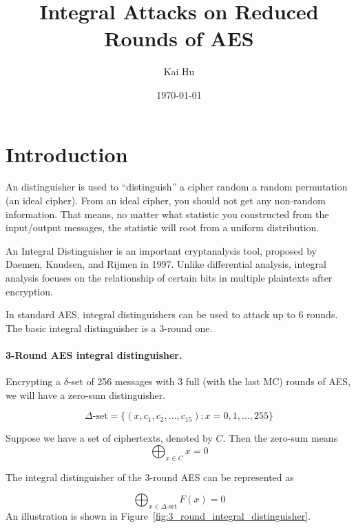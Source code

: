 \documentclass[12pt,journal=tosc, notanonymous]{iacrtrans}
\title{Integral Attacks on Reduced Rounds of AES}
\author{Kai Hu}
\date{\today}
\begin{document}
\maketitle


\section{Introduction}

An distinguisher is used to ``distinguish'' a cipher random a random permutation (an ideal cipher). 
From an ideal cipher, you should not get any non-random information. 
That means, no matter what statistic you constructed from the input/output messages, the statistic will root from a uniform distribution.

An Integral Distinguisher is an important cryptanalysis tool, proposed by Daemen, Knudsen,
and Rijmen in 1997. Unlike differential analysis, integral analysis focuses on the
relationship of certain bits in multiple plaintexts after encryption.

In standard AES, integral distinguishers can be used to attack up to 6 rounds.
The basic integral distinguisher is a 3-round one. 



\paragraph{3-Round AES integral distinguisher.}

Encrypting a $\delta$-set of 256 messages with 3 full (with the last MC) rounds of AES, we will have a zero-sum distinguisher. 

$$
\Delta\text{-set} = \{ (x, c_1, c_2, \ldots, c_{15}): x = 0, 1, \ldots, 255 \}
$$ 

Suppose we have a set of ciphertexts, denoted by $C$. Then the zero-sum means 
$$
\bigoplus_{x \in C} x = 0
$$

The integral distinguisher of the 3-round AES can be represented as 

$$
\bigoplus_{x \in \Delta\text{-set}} F(x) = 0
$$
An illustration is shown in Figure~\ref{fig:3_round_integral_distinguisher}.
\end{document}
